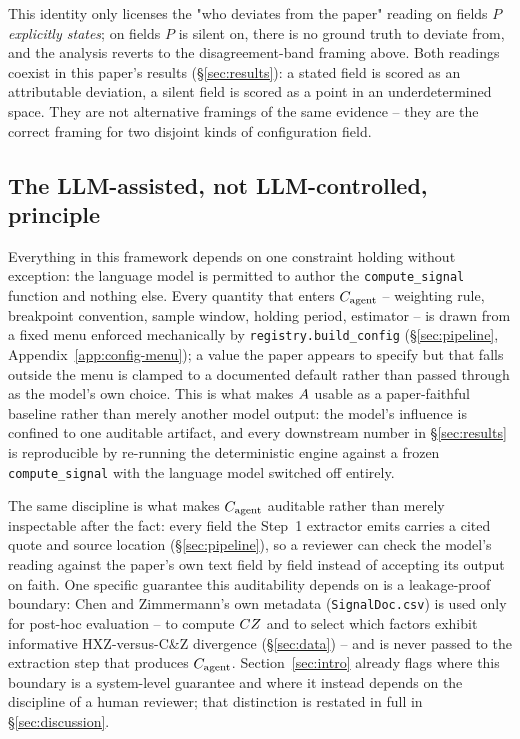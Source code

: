 This identity only licenses the "who deviates from the paper" reading on
fields $P$ \emph{explicitly states}; on fields $P$ is silent on, there is no
ground truth to deviate from, and the analysis reverts to the
disagreement-band framing above. Both readings coexist in this paper's
results (\S\ref{sec:results}): a stated field is scored as an attributable
deviation, a silent field is scored as a point in an underdetermined space.
They are not alternative framings of the same evidence -- they are the
correct framing for two disjoint kinds of configuration field.

\subsection{The LLM-assisted, not LLM-controlled, principle}

Everything in this framework depends on one constraint holding without
exception: the language model is permitted to author the
\texttt{compute\_signal} function and nothing else. Every quantity that
enters $C_{\text{agent}}$ -- weighting rule, breakpoint convention, sample window,
holding period, estimator -- is drawn from a fixed menu enforced
mechanically by \texttt{registry.build\_config} (\S\ref{sec:pipeline},
Appendix~\ref{app:config-menu}); a value the paper appears to specify but
that falls outside the menu is clamped to a documented default rather than
passed through as the model's own choice. This is what makes $A$ usable
as a paper-faithful baseline rather than merely another model output: the
model's influence is confined to one auditable artifact, and every
downstream number in \S\ref{sec:results} is reproducible by re-running the
deterministic engine against a frozen \texttt{compute\_signal} with the
language model switched off entirely.

The same discipline is what makes $C_{\text{agent}}$ auditable rather than merely
inspectable after the fact: every field the Step~1 extractor emits carries
a cited quote and source location (\S\ref{sec:pipeline}), so a reviewer can
check the model's reading against the paper's own text field by field
instead of accepting its output on faith. One specific guarantee this
auditability depends on is a leakage-proof boundary: Chen and
Zimmermann's own metadata (\texttt{SignalDoc.csv}) is used only for
post-hoc evaluation -- to compute $CZ$ and to select which factors exhibit
informative HXZ-versus-C\&Z divergence (\S\ref{sec:data}) -- and is never
passed to the extraction step that produces $C_{\text{agent}}$. Section~\ref{sec:intro}
already flags where this boundary is a system-level guarantee and where it
instead depends on the discipline of a human reviewer; that distinction is
restated in full in \S\ref{sec:discussion}.
